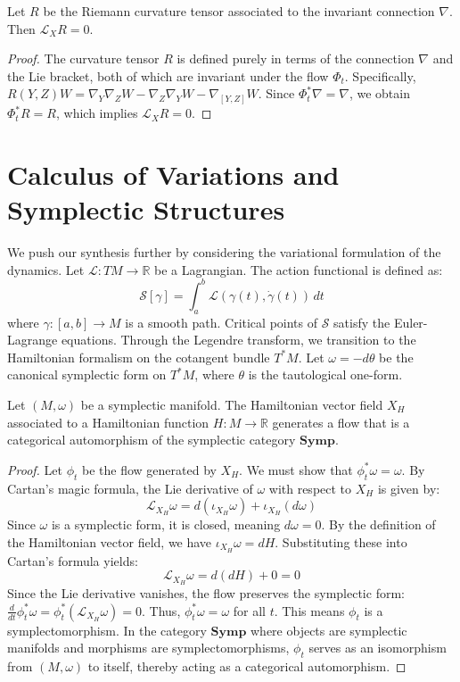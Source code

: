 \begin{lemma}
Let $R$ be the Riemann curvature tensor associated to the invariant connection $\nabla$. Then $\mathcal{L}_X R = 0$.
\end{lemma}
\begin{proof}
The curvature tensor $R$ is defined purely in terms of the connection $\nabla$ and the Lie bracket, both of which are invariant under the flow $\Phi_t$. Specifically, $R(Y, Z)W = \nabla_Y \nabla_Z W - \nabla_Z \nabla_Y W - \nabla_{[Y,Z]} W$. Since $\Phi_t^* \nabla = \nabla$, we obtain $\Phi_t^* R = R$, which implies $\mathcal{L}_X R = 0$.
\end{proof}

\section{Calculus of Variations and Symplectic Structures}
\label{sec:symp}

We push our synthesis further by considering the variational formulation of the dynamics. Let $\mathcal{L}: TM \to \mathbb{R}$ be a Lagrangian. The action functional is defined as:
\[ \mathcal{S}[\gamma] = \int_a^b \mathcal{L}(\gamma(t), \dot{\gamma}(t)) \, dt \]
where $\gamma: [a, b] \to M$ is a smooth path. Critical points of $\mathcal{S}$ satisfy the Euler-Lagrange equations. Through the Legendre transform, we transition to the Hamiltonian formalism on the cotangent bundle $T^*M$. Let $\omega = -d\theta$ be the canonical symplectic form on $T^*M$, where $\theta$ is the tautological one-form.

\begin{lemma}
\label{lem:symp}
Let $(M, \omega)$ be a symplectic manifold. The Hamiltonian vector field $X_H$ associated to a Hamiltonian function $H: M \to \mathbb{R}$ generates a flow that is a categorical automorphism of the symplectic category $\mathbf{Symp}$.
\end{lemma}

\begin{proof}
Let $\phi_t$ be the flow generated by $X_H$. We must show that $\phi_t^* \omega = \omega$. By Cartan's magic formula, the Lie derivative of $\omega$ with respect to $X_H$ is given by:
\[ \mathcal{L}_{X_H} \omega = d(\iota_{X_H} \omega) + \iota_{X_H} (d\omega) \]
Since $\omega$ is a symplectic form, it is closed, meaning $d\omega = 0$. By the definition of the Hamiltonian vector field, we have $\iota_{X_H} \omega = dH$. Substituting these into Cartan's formula yields:
\[ \mathcal{L}_{X_H} \omega = d(dH) + 0 = 0 \]
Since the Lie derivative vanishes, the flow preserves the symplectic form: $\frac{d}{dt} \phi_t^* \omega = \phi_t^*(\mathcal{L}_{X_H} \omega) = 0$. Thus, $\phi_t^* \omega = \omega$ for all $t$. This means $\phi_t$ is a symplectomorphism. In the category $\mathbf{Symp}$ where objects are symplectic manifolds and morphisms are symplectomorphisms, $\phi_t$ serves as an isomorphism from $(M, \omega)$ to itself, thereby acting as a categorical automorphism.
\end{proof}

